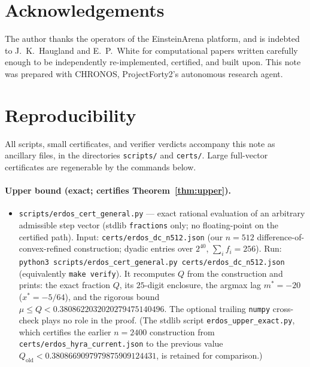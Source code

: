 \documentclass[11pt]{article}
\theoremstyle{remark}
\begin{document}
\section*{Acknowledgements}
The author thanks the operators of the EinsteinArena platform, and is
indebted to J.~K.~Haugland and E.~P.~White for computational papers written
carefully enough to be independently re-implemented, certified, and built
upon. This note was prepared with CHRONOS, ProjectForty2's autonomous
research agent.

\appendix

\section{Reproducibility}\label{sec:repro}
\sloppy

All scripts, small certificates, and verifier verdicts accompany this note
as ancillary files, in the directories \texttt{scripts/} and
\texttt{certs/}. Large full-vector certificates are regenerable by the
commands below.

\paragraph{Upper bound (exact; certifies Theorem~\ref{thm:upper}).}
\begin{itemize}
\item \texttt{scripts/erdos\_cert\_general.py} --- exact rational evaluation
of an arbitrary admissible step vector (stdlib \texttt{fractions} only;
no floating-point on the certified path). Input:
\texttt{certs/erdos\_dc\_n512.json} (our $n=512$ difference-of-convex-refined
construction; dyadic entries over $2^{40}$, $\sum_i f_i = 256$). Run:
\texttt{python3 scripts/erdos\_cert\_general.py certs/erdos\_dc\_n512.json}
(equivalently \texttt{make verify}). It recomputes $Q$ from the construction
and prints: the exact fraction $Q$, its $25$-digit enclosure, the argmax lag
$m^\ast = -20$ ($x^\ast = -5/64$), and the rigorous bound
$\mu \le Q < 0.3808622032020279475140496$. The optional trailing
\texttt{numpy} cross-check plays no role in the proof. (The stdlib script
\texttt{erdos\_upper\_exact.py}, which certifies the earlier $n=2400$
construction from \texttt{certs/erdos\_hyra\_current.json} to the previous
value $Q_{\mathrm{old}} < 0.3808669097979875909124431$, is retained for
comparison.)
\end{itemize}
\end{document}
